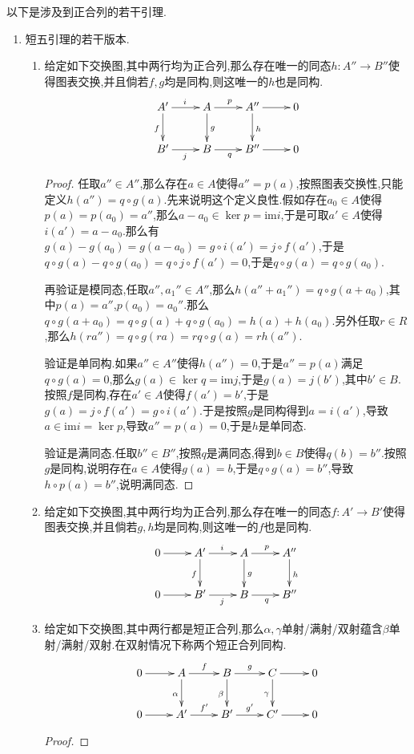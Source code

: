 以下是涉及到正合列的若干引理.
\begin{enumerate}
	\item 短五引理的若干版本.
	\begin{enumerate}
		\item 给定如下交换图,其中两行均为正合列,那么存在唯一的同态$h:A''\to B''$使得图表交换,并且倘若$f,g$均是同构,则这唯一的$h$也是同构.
		$$\xymatrix{A'\ar[r]^i\ar[d]_f&A\ar[r]^p\ar[d]^g&A''\ar[r]\ar[d]^h&0\\ B'\ar[r]_j&B\ar[r]_q&B''\ar[r]&0}$$
		\begin{proof}
			
			任取$a''\in A''$,那么存在$a\in A$使得$a''=p(a)$,按照图表交换性,只能定义$h(a'')=q\circ g(a)$.先来说明这个定义良性.假如存在$a_0\in A$使得$p(a)=p(a_0)=a''$,那么$a-a_0\in\ker p=\mathrm{im}i$,于是可取$a'\in A$使得$i(a')=a-a_0$.那么有$g(a)-g(a_0)=g(a-a_0)=g\circ i(a')=j\circ f(a')$,于是$q\circ g(a)-q\circ g(a_0)=q\circ j\circ f(a')=0$,于是$q\circ g(a)=q\circ g(a_0)$.
			
			再验证是模同态,任取$a'',a_1''\in A''$,那么$h(a''+a_1'')=q\circ g(a+a_0)$,其中$p(a)=a''$,$p(a_0)=a_0''$.那么$q\circ g(a+a_0)=q\circ g(a)+q\circ g(a_0)=h(a)+h(a_0)$.另外任取$r\in R$,那么$h(ra'')=q\circ g(ra)=rq\circ g(a)=rh(a'')$.
			
			验证是单同构.如果$a''\in A''$使得$h(a'')=0$,于是$a''=p(a)$满足$q\circ g(a)=0$,那么$g(a)\in\ker q=\mathrm{im}j$,于是$g(a)=j(b')$,其中$b'\in B$.按照$f$是同构,存在$a'\in A$使得$f(a')=b'$,于是$g(a)=j\circ f(a')=g\circ i(a')$.于是按照$g$是同构得到$a=i(a')$,导致$a\in\mathrm{im}i=\ker p$,导致$a''=p(a)=0$,于是$h$是单同态.
			
			验证是满同态.任取$b''\in B''$,按照$q$是满同态,得到$b\in B$使得$q(b)=b''$.按照$g$是同构,说明存在$a\in A$使得$g(a)=b$,于是$q\circ g(a)=b''$,导致$h\circ p(a)=b''$,说明满同态.
		\end{proof}
		\item 给定如下交换图,其中两行均为正合列,那么存在唯一的同态$f:A'\to B'$使得图表交换,并且倘若$g,h$均是同构,则这唯一的$f$也是同构.
		$$\xymatrix{0\ar[r]&A'\ar[r]^i\ar[d]_f&A\ar[r]^p\ar[d]^g&A''\ar[d]^h\\0\ar[r]&B'\ar[r]_j&B\ar[r]_q&B''}$$
		\item 给定如下交换图,其中两行都是短正合列,那么$\alpha,\gamma$单射/满射/双射蕴含$\beta$单射/满射/双射.在双射情况下称两个短正合列同构.
		$$\xymatrix{0\ar[r]&A\ar[d]_{\alpha}\ar[r]^{f}&B\ar[d]_{\beta}\ar[r]^{g}&C\ar[d]_{\gamma}\ar[r]&0\\0\ar[r]&A'\ar[r]^{f'}&B'\ar[r]^{g'}&C'\ar[r]&0}$$
		\begin{proof}
			

\end{proof}
\end{enumerate}
\end{enumerate}
